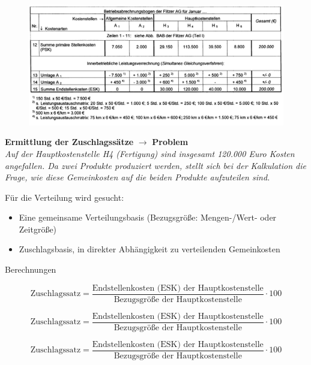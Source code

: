 \documentclass[a4paper,11pt, twoside]{article}
\begin{document}
\begin{figure}[h]
 \begin{center}
   \includegraphics[scale=0.5]{bilder/leistungsverechnung2.png}
 \end{center}
\end{figure}

\textbf{Ermittlung der Zuschlagssätze} $\rightarrow$ \textbf{Problem}\\
\textit{Auf der Hauptkostenstelle H4 (Fertigung) sind insgesamt 120.000 Euro Kosten angefallen. Da zwei Produkte produziert werden, stellt sich bei der Kalkulation die Frage, wie diese Gemeinkosten auf die beiden Produkte aufzuteilen sind.}

Für die Verteilung wird gesucht:
\begin{itemize}
	\item Eine gemeinsame Verteilungsbasis (Bezugsgröße: Mengen-/Wert- oder Zeitgröße)
	\item Zuschlagsbasis, in direkter Abhängigkeit zu verteilenden Gemeinkosten
\end{itemize}  

Berechnungen

\begin{equation}
\text{Zuschlagssatz} = \frac{\text{Endstellenkosten (ESK) der Hauptkostenstelle}}{\text{Bezugsgröße der Hauptkostenstelle}} \cdot 100
\end{equation}

\begin{equation}
\text{Zuschlagssatz} = \frac{\text{Endstellenkosten (ESK) der Hauptkostenstelle}}{\text{Bezugsgröße der Hauptkostenstelle}} \cdot 100
\end{equation}

\begin{equation}
\text{Zuschlagssatz} = \frac{\text{Endstellenkosten (ESK) der Hauptkostenstelle}}{\text{Bezugsgröße der Hauptkostenstelle}} \cdot 100
\end{equation}
\end{document}
